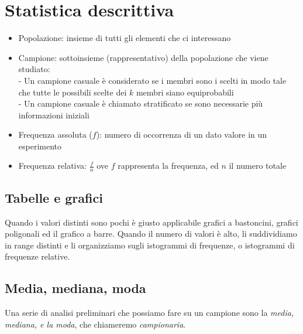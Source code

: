 %
%
%
%

\graphicspath{ {./images/} } 	




\section{Statistica descrittiva}
\begin{itemize}
\item Popolazione: insieme di tutti gli elementi che ci interessano
\item Campione: sottoinsieme (rappresentativo) della popolazione che viene studiato:\\
		- Un campione casuale è considerato se i membri sono i scelti in modo tale che tutte le possibili scelte dei $k$ membri siano equiprobabili\\
		- Un campione casuale è chiamato stratificato se sono necessarie più informazioni iniziali
\item Frequenza assoluta ($f$): numero di occorrenza di un dato valore in un esperimento
\item Frequenza relativa: $\frac{f}{n}$ ove $f$ rappresenta la frequenza, ed $n$ il numero totale
\end{itemize}

\subsection{Tabelle e grafici}
Quando i valori distinti sono pochi è giusto applicabile grafici a bastoncini, grafici poligonali ed il grafico a barre. Quando il numero di valori è alto, li suddividiamo in range distinti e li organizziamo sugli istogrammi di frequenze, o istogrammi di frequenze relative.

\subsection{Media, mediana, moda}
Una serie di analisi preliminari che possiamo fare su un campione sono la \emph{media, mediana, e la moda}, che chiameremo \emph{campionaria}. 


